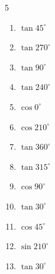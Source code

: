 \begin{multicols}{5}
\begin{enumerate}
        \phantom{$\displaystyle =1$}

  \item $\displaystyle \tan{45^\circ}$

        \phantom{$\displaystyle =1$}

  \item $\displaystyle \tan{270^\circ}$

        \phantom{$\displaystyle なし$}

  \item $\displaystyle \tan{90^\circ}$

        \phantom{$\displaystyle なし$}

  \item $\displaystyle \tan{240^\circ}$


  \item $\displaystyle \cos{0^\circ}$

        \phantom{$\displaystyle =1$}

  \item $\displaystyle \cos{210^\circ}$


  \item $\displaystyle \tan{360^\circ}$

        \phantom{$\displaystyle =0$}

  \item $\displaystyle \tan{315^\circ}$

        \phantom{$\displaystyle =-1$}

  \item $\displaystyle \cos{90^\circ}$

        \phantom{$\displaystyle =0$}

  \item $\displaystyle \tan{30^\circ}$


\columnbreak %

  \item $\displaystyle \cos{45^\circ}$


  \item $\displaystyle \sin{210^\circ}$


  \item $\displaystyle \tan{30^\circ}$


\end{enumerate}
\end{multicols}
